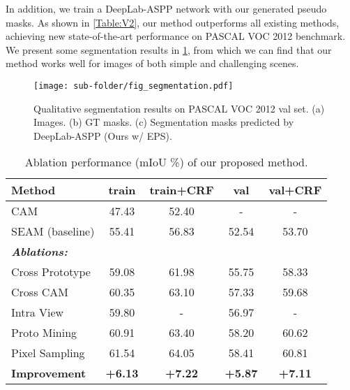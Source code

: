 \documentclass[10pt,twocolumn,letterpaper]{article}
\begin{document}
In addition, we train a DeepLab-ASPP network with our generated pseudo masks. As shown in \cref{Table:V2}, our method outperforms all existing methods, achieving new state-of-the-art performance on PASCAL VOC 2012 benchmark. We present some segmentation results in \cref{fig:seg_results}, from which we can find that our method works well for images of both simple and challenging scenes. 




\begin{figure}[tp]
\centering
\begin{center}
\texttt{[image: sub-folder/fig\_segmentation.pdf]}
\end{center}
\caption{Qualitative segmentation results on PASCAL VOC 2012 val set. (a) Images. (b) GT masks. (c) Segmentation masks predicted by DeepLab-ASPP (Ours w/ EPS).}
\label{fig:seg_results}
\end{figure}



\begin{table}[tp]
\caption{Ablation performance (mIoU \%) of our proposed method. }
\label{Ablation1}
\centering
\small
\begin{tabular}{l|c|c|c|c}
\hline
\textbf{Method}      & \textbf{train} & \textbf{train}\scriptsize{+CRF} & \textbf{val} & \textbf{val}\scriptsize{+CRF} \\
\hline \hline
CAM                  & 47.43          & 52.40              & -            & -                \\
SEAM (baseline)    & 55.41          & 56.83              & 52.54        & 53.70            \\ 
\hline
\multicolumn{5}{l}{\textit{\textbf{Ablations:}}}                                             \\
 Cross Prototype     & 59.08          & 61.98              & 55.75        & 58.33            \\
 Cross CAM           & 60.35          & 63.10              & 57.33        & 59.68            \\
 Intra View          & 59.80          & -                  & 56.97        & -                \\
 Proto Mining        & 60.91          & 63.40              & 58.20        & 60.62            \\
 Pixel Sampling      & 61.54          & 64.05              & 58.41        & 60.81            \\
\hline
\textbf{Improvement} &\textbf{+6.13 }          & \textbf{+7.22}               &\textbf{+5.87}         &\textbf{+7.11} \\
\hline
\end{tabular}
\end{table}
\end{document}
